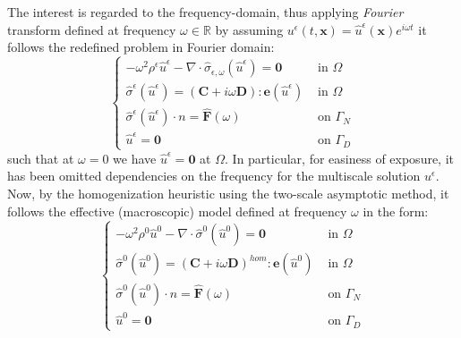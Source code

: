 The interest is regarded to the frequency-domain, thus applying \textit{Fourier} transform defined at frequency $\omega \in \mathbb{R}$ by assuming $u^{\epsilon}(t,\mathbf{x}) = \hat{u}^{\epsilon}(\mathbf{x}) e^{i\omega t}$ it follows the redefined problem in Fourier domain:
\begin{equation*}
    \left \{
    \begin{array}{cc}
        -\omega^2 \rho^{\epsilon} \hat{u}^{\epsilon} - \nabla \cdot \hat{\sigma}_{\epsilon,\omega}(\hat{u}^{\epsilon}) = \mathbf{0} & \text{ in } \Omega  \\
        \hat{\sigma}^{\epsilon} (\hat{u}^{\epsilon}) = (\mathbf{C} + i\omega \mathbf{D}):\mathbf{e}(\hat{u}^{\epsilon}) & \text{ in } \Omega \\
        \hat{\sigma}^{\epsilon} (\hat{u}^{\epsilon}) \cdot n = \hat{\mathbf{F}}(\omega) & \text{ on } \Gamma_N \\
        \hat{u}^{\epsilon} = \mathbf{0} & \text{ on } \Gamma_D
    \end{array}
    \right .
\end{equation*}
such that at $\omega = 0$ we have $\hat{u}^{\epsilon}=\mathbf{0}$ at $\Omega$. In particular, for easiness of exposure, it has been omitted dependencies on the frequency for the multiscale solution $u^{\epsilon}$.\\
Now, by the homogenization heuristic using the two-scale asymptotic method, it follows the effective (macroscopic) model defined at frequency $\omega$ in the form:
\begin{equation*}
    \left \{
    \begin{array}{cc}
        -\omega^2 \rho^{0} \hat{u}^0 - \nabla \cdot \hat{\sigma}^0(\hat{u}^0)  = \mathbf{0} & \text{ in } \Omega \\
        \hat{\sigma}^{0} (\hat{u}^0)  = (\mathbf{C} + i\omega \mathbf{D})^{hom}:\mathbf{e}(\hat{u}^0) & \text{ in } \Omega \\
        \hat{\sigma}^{0} (\hat{u}^0) \cdot n = \hat{\mathbf{F}}(\omega) & \text{ on } \Gamma_N \\
        \hat{u}^0 = \mathbf{0} & \text{ on } \Gamma_D
    \end{array}
    \right .
\end{equation*}

